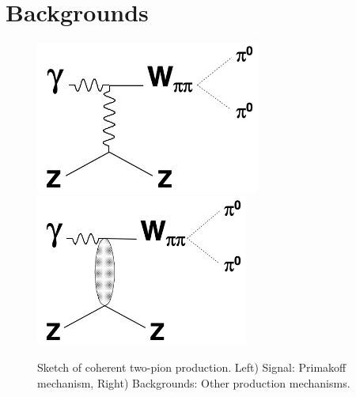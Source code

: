 
\section{Backgrounds}

 \begin{figure}[tbh]
\begin{center}
\includegraphics[height=5cm,clip=true]{figures/Diagram_Primakoff.png}
\includegraphics[height=5cm,clip=true]{figures/Diagram_hadronic.png}
\caption{Sketch of coherent two-pion production. Left) Signal: Primakoff mechanism, Right) Backgrounds: Other production mechanisms.
\label{fig:Diagram}}
\end{center}
\end{figure}

